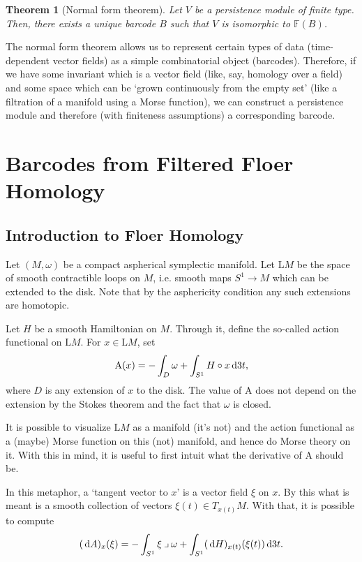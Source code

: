 \documentclass{article}
\newtheorem{theorem}{Theorem}
\theoremstyle{nonumberplain}
\newcommand{\FF}{\mathbb{F}} %
\newcommand{\LL}{\mathrm{L}}
\renewcommand{\AA}{\mathrm{A}}
\newcommand{\into}{\mathbin{\lrcorner}}
\begin{document}
\begin{theorem}[Normal form theorem]
Let $V$ be a persistence module of finite type. Then, there exists a unique barcode $B$ such that $V$ is isomorphic to $\FF(B)$.
\end{theorem}

The normal form theorem allows us to represent certain types of data (time-dependent vector fields) as a simple combinatorial object (barcodes). Therefore, if we have some invariant which is a vector field (like, say, homology over a field) and some space which can be `grown continuously from the empty set' (like a filtration of a manifold using a Morse function), we can construct a persistence module and therefore (with finiteness assumptions) a corresponding barcode.

\section{Barcodes from Filtered Floer Homology}

\subsection{Introduction to Floer Homology}

Let $(M, \omega)$ be a compact aspherical symplectic manifold. Let $\LL M$ be the space of smooth contractible loops on $M$, i.e. smooth maps $S^1 \to M$ which can be extended to the disk. Note that by the asphericity condition any such extensions are homotopic.

Let $H$ be a smooth Hamiltonian on $M$. Through it, define the so-called action functional on $\LL M$. For $x \in \LL M$, set
\begin{equation}
\AA(x) = - \int_D \omega + \int_{S^1} H \circ x \dl3 t,
\end{equation}
where $D$ is any extension of $x$ to the disk. The value of $\AA$ does not depend on the extension by the Stokes theorem and the fact that $\omega$ is closed.

It is possible to visualize $\LL M$ as a manifold (it's not) and the action functional as a (maybe) Morse function on this (not) manifold, and hence do Morse theory on it. With this in mind, it is useful to first intuit what the derivative of $\AA$ should be.

In this metaphor, a `tangent vector to $x$' is a vector field $\xi$ on $x$. By this what is meant is a smooth collection of vectors $\xi(t) \in T_{x(t)} M$. With that, it is possible to compute
\begin{equation}
 (\dl A)_x(\xi) = - \int_{S^1} \xi \into \omega + \int_{S^1} (\dl H)_{x(t)} (\xi(t)) \dl3t. 
\end{equation}
\end{document}
